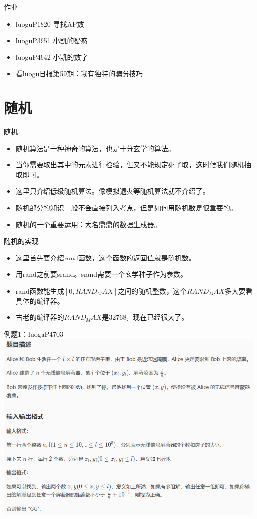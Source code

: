 \documentclass{beamer}[UTF-8]
\begin{document}
\begin{frame}{作业}
 \pause
\begin{itemize}
\item luoguP1820 寻找AP数
\item luoguP3951 小凯的疑惑
\item luoguP4942 小凯的数字
\item 看luogu日报第59期：我有独特的骗分技巧
\end{itemize}
\end{frame}
\section{随机} %

\begin{frame}{随机}
 \pause
\begin{itemize}
\item 随机算法是一种神奇的算法，也是十分玄学的算法。 \pause
\item 当你需要取出其中的元素进行检验，但又不能规定死了取，这时候我们随机抽取即可。 \pause
\item 这里只介绍低级随机算法。像模拟退火等随机算法就不介绍了。  \pause
\item 随机部分的知识一般不会直接列入考点，但是如何用随机数是很重要的。 \pause
\item 随机的一个重要运用：大名鼎鼎的数据生成器。
\end{itemize}
\end{frame}

\begin{frame}{随机的实现}
 \pause
\begin{itemize}
\item 这里首先要介绍rand函数，这个函数的返回值就是随机数。 \pause
\item 用rand之前要srand。srand需要一个玄学种子作为参数。 \pause
\item rand函数能生成$[0,RAND_MAX]$之间的随机整数，这个$RAND_MAX$多大要看具体的编译器。 \pause
\item 古老的编译器的$RAND_MAX$是32768，现在已经很大了。
\end{itemize}
\end{frame}

\begin{frame}{例题1：luoguP4703}
\includegraphics[width=\textwidth, height=\textheight]{luoguP4703.png}
\end{frame}
\end{document}
